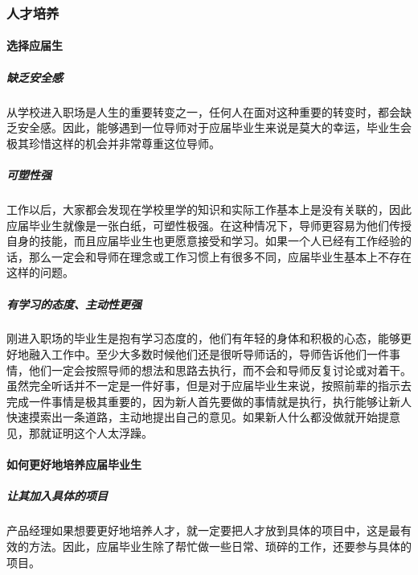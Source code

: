 \documentclass[letterpaper,11pt,english]{sphinxmanual}
\begin{document}
\subsubsection{人才培养}
\label{\detokenize{chapter_AI_dive/develop:id1}}\label{\detokenize{chapter_AI_dive/develop::doc}}

\paragraph{选择应届生}
\label{\detokenize{chapter_AI_dive/develop:id2}}

\subparagraph{缺乏安全感}
\label{\detokenize{chapter_AI_dive/develop:id3}}
从学校进入职场是人生的重要转变之一，任何人在面对这种重要的转变时，都会缺乏安全感。因此，能够遇到一位导师对于应届毕业生来说是莫大的幸运，毕业生会极其珍惜这样的机会并非常尊重这位导师。


\subparagraph{可塑性强}
\label{\detokenize{chapter_AI_dive/develop:id4}}
工作以后，大家都会发现在学校里学的知识和实际工作基本上是没有关联的，因此应届毕业生就像是一张白纸，可塑性极强。在这种情况下，导师更容易为他们传授自身的技能，而且应届毕业生也更愿意接受和学习。如果一个人已经有工作经验的话，那么一定会和导师在理念或工作习惯上有很多不同，应届毕业生基本上不存在这样的问题。


\subparagraph{有学习的态度、主动性更强}
\label{\detokenize{chapter_AI_dive/develop:id5}}
刚进入职场的毕业生是抱有学习态度的，他们有年轻的身体和积极的心态，能够更好地融入工作中。至少大多数时候他们还是很听导师话的，导师告诉他们一件事情，他们一定会按照导师的想法和思路去执行，而不会和导师反复讨论或对着干。虽然完全听话并不一定是一件好事，但是对于应届毕业生来说，按照前辈的指示去完成一件事情是极其重要的，因为新人首先要做的事情就是执行，执行能够让新人快速摸索出一条道路，主动地提出自己的意见。如果新人什么都没做就开始提意见，那就证明这个人太浮躁。


\paragraph{如何更好地培养应届毕业生}
\label{\detokenize{chapter_AI_dive/develop:id6}}

\subparagraph{让其加入具体的项目}
\label{\detokenize{chapter_AI_dive/develop:id7}}
产品经理如果想要更好地培养人才，就一定要把人才放到具体的项目中，这是最有效的方法。因此，应届毕业生除了帮忙做一些日常、琐碎的工作，还要参与具体的项目。
\end{document}
